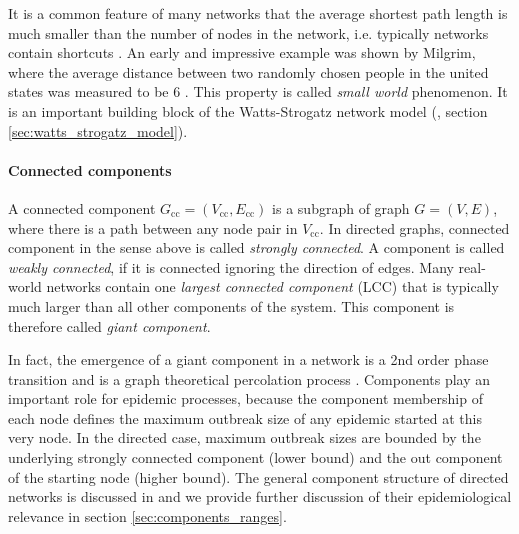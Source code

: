 It is a common feature of many networks that the average shortest path length is much smaller than the number of nodes in the network, i.e. typically networks contain shortcuts \citep{RevModPhys.74}.
An early and impressive example was shown by Milgrim, where the average distance between two randomly chosen people in the united states was measured to be 6 \citep{Milgram:1967}. 
This property is called \emph{small world} phenomenon.
It is an important building block of the Watts-Strogatz network model (\citep{Watts:1998}, section \ref{sec:watts_strogatz_model}).



\paragraph{Connected components\color{Cayenne}{.}}
A connected component $G_\mathrm{cc}=(V_\mathrm{cc},E_\mathrm{cc})$ is a subgraph of graph $G=(V,E)$, where there is a path between any node pair in $V_\mathrm{cc}$.
In directed graphs, connected component in the sense above is called \emph{strongly connected}.
A component is called \emph{weakly connected}, if it is connected ignoring the direction of edges.
Many real-world networks contain one \emph{largest connected component} (LCC) that is typically much larger than all other components of the system.
This component is therefore called \emph{giant component}.

In fact, the emergence of a giant component in a network is a 2nd order phase transition and is a graph theoretical percolation process \citep{Newman2003}. 
Components play an important role for epidemic processes, because the component membership of each node defines the maximum outbreak size of any epidemic started at this very node.
In the directed case, maximum outbreak sizes are bounded by the underlying strongly connected component (lower bound) and the out component of the starting node (higher bound).
The general component structure of directed networks is discussed in \citep{Dorogovtsev:2001jd} and we provide further discussion of their epidemiological relevance in section \ref{sec:components_ranges}.


